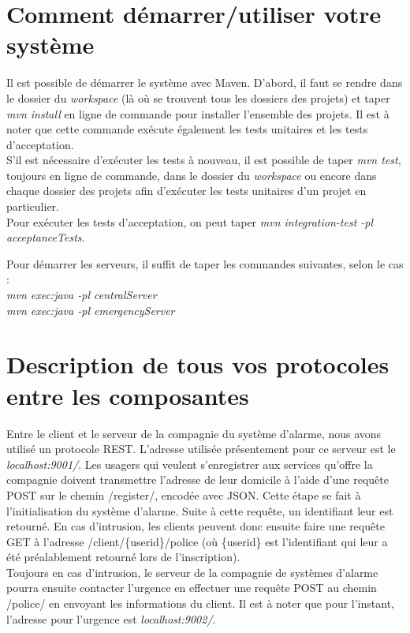 \section*{Comment démarrer/utiliser votre système}
Il est possible de démarrer le système avec Maven. D'abord, il faut se rendre dans le dossier du \emph{workspace} (là où se trouvent tous les dossiers des projets) et taper \emph{mvn install} en ligne de commande pour installer l'ensemble des projets. Il est à noter que cette commande exécute également les tests unitaires et les tests d'acceptation.\\
S'il est nécessaire d'exécuter les tests à nouveau, il est possible de taper \emph{mvn test}, toujours en ligne de commande, dans le dossier du \emph{workspace} ou encore dans chaque dossier des projets afin d'exécuter les tests unitaires d'un projet en particulier.\\
Pour exécuter les tests d'acceptation, on peut taper \emph{mvn integration-test -pl acceptanceTests}.

Pour démarrer les serveurs, il suffit de taper les commandes suivantes, selon le cas :\\
\emph{mvn exec:java -pl centralServer}\\
\emph{mvn exec:java -pl emergencyServer}

\section*{Description de tous vos protocoles entre les composantes}
Entre le client et le serveur de la compagnie du système d'alarme, nous avons utilisé un protocole REST. L'adresse utilisée présentement pour ce serveur est le \emph{localhost:9001/}. Les usagers qui veulent s'enregistrer aux services qu'offre la compagnie doivent transmettre l'adresse de leur domicile à l'aide d'une requête POST sur le chemin /register/, encodée avec JSON. Cette étape se fait à l'initialisation du système d'alarme. Suite à cette requête, un identifiant leur est retourné. En cas d'intrusion, les clients peuvent donc ensuite faire une requête GET à l'adresse /client/\{userid\}/police (où \{userid\} est l'identifiant qui leur a été préalablement retourné lors de l'inscription). \\

Toujours en cas d'intrusion, le serveur de la compagnie de systèmes d'alarme pourra ensuite contacter l'urgence en effectuer une requête POST au chemin /police/ en envoyant les informations du client. Il est à noter que pour l'instant, l'adresse pour l'urgence est \emph{localhost:9002/}.

